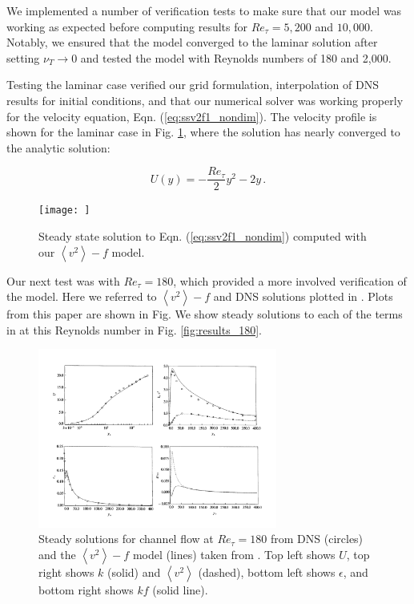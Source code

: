 \documentclass[a4paper,11pt]{article}
\newcommand{\chevron}[1]{\left\langle #1 \right\rangle}
\begin{document}
We implemented a number of verification tests to make sure that our model was
working as expected before computing results for $Re_\tau = 5,200$ and
$10,000$. Notably, we ensured that the model converged to the laminar solution
after setting $\nu_T \rightarrow 0$ and tested the model with Reynolds numbers
of 180 and 2,000. 


Testing the laminar case verified our grid formulation, interpolation of DNS
results for initial conditions, and that our numerical solver was working
properly for the velocity equation, Eqn.
(\ref{eq:ssv2f1_nondim}). The velocity profile is shown for the laminar case in Fig.
\ref{fig:laminar}, where the solution has nearly converged to the analytic
solution: 

\begin{equation*}
  U(y) = -\frac{Re_\tau}{2}y^2 - 2y \, .
\end{equation*}

\begin{figure}
 \centering
 \texttt{[image: ]}
 \caption{Steady state solution to Eqn. (\ref{eq:ssv2f1_nondim}) computed with
our $\chevron{v^2}-f$ model. }
 \label{fig:laminar}
\end{figure}


Our next test was with $Re_\tau = 180$, which provided a more involved
verification of the model. Here we referred to $\chevron{v^2} - f$ and DNS
solutions plotted in \cite{durbin180}. Plots from this paper are shown in Fig.  We show steady solutions to each of the terms in
at this Reynolds number in Fig. \ref{fig:results_180}.

\begin{figure}
 \centering
 \includegraphics[width=0.7\textwidth]{durbin180}
 \caption{Steady solutions for channel flow at $Re_\tau=180$ from DNS (circles)
and the $\chevron{v^2}-f$ model (lines) taken from \cite{durbin180}. Top left shows $U$, top right shows $k$
(solid) and $\chevron{v^2}$ (dashed), bottom left shows $\epsilon$, and bottom
right shows $kf$ (solid line).}
 \label{fig:durbin180}
\end{figure}
\end{document}
